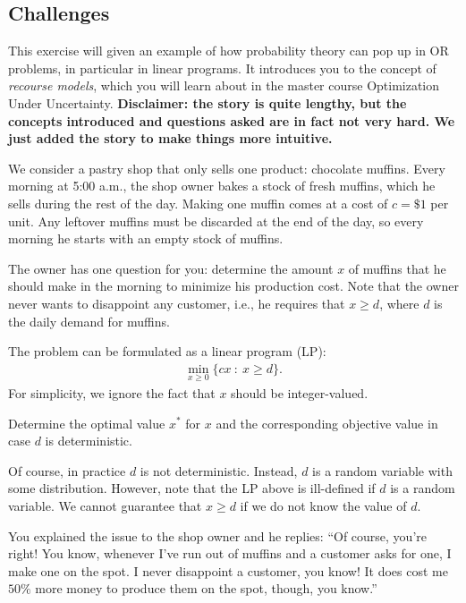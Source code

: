 \documentclass[assignments]{subfiles}
\begin{document}
\subsection{Challenges}
\label{sec:challenges}

This exercise will given an example of how probability theory can pop up in OR problems, in particular in linear programs. It introduces you to the concept of \textit{recourse models}, which you will learn about in the master course Optimization Under Uncertainty. \textbf{Disclaimer: the story is quite lengthy, but the concepts introduced and questions asked are in fact not very hard. We just added the story to make things more intuitive.}

We consider a pastry shop that only sells one product: chocolate muffins. Every morning at 5:00 a.m., the shop owner bakes a stock of fresh muffins, which he sells during the rest of the day. Making one muffin comes at a cost of $c = \$ 1$ per unit. Any leftover muffins must be discarded at the end of the day, so every morning he starts with an empty stock of muffins.

The owner has one question for you: determine the amount $x$ of muffins that he should make in the morning to minimize his production cost. Note that the owner never wants to disappoint any customer, i.e., he requires that $x \geq d$, where $d$ is the daily demand for muffins.

The problem can be formulated as a linear program (LP):
\begin{align}
    \min_{x \geq 0} \{ cx \ : \ x \geq d \}.
\end{align}
For simplicity, we ignore the fact that $x$ should be integer-valued.

\begin{exercise}
Determine the optimal value $x^*$ for $x$ and the corresponding objective value in case $d$ is deterministic.
\end{exercise}

Of course, in practice $d$ is not deterministic. Instead, $d$ is a random variable with some distribution. However, note that the LP above is ill-defined if $d$ is a random variable. We cannot guarantee that $x \geq d$ if we do not know the value of $d$.

You explained the issue to the shop owner and he replies: ``Of course, you're right! You know, whenever I've run out of muffins and a customer asks for one, I make one on the spot. I never disappoint a customer, you know! It does cost me $50 \%$ more money to produce them on the spot, though, you know.''
\end{document}
